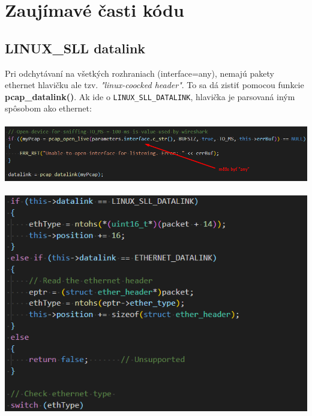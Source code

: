 \documentclass{article}
\begin{document}
    \section{Zaujímavé časti kódu}
        \subsection{LINUX\_SLL datalink}
        Pri odchytávaní na všetkých rozhraniach (interface=any), nemajú pakety ethernet hlavičku ale tzv. \emph{"linux-coocked header"}.
        To sa dá zistiť pomocou funkcie \textbf{pcap\_datalink()}. Ak ide o \texttt{LINUX\_SLL\_DATALINK}, hlavička je parsovaná iným spôsobom ako ethernet:\\\\
        \includegraphics[scale=0.6]{datalink.png}\\\\
        \includegraphics[scale=0.6]{ethernet.png}

        \newpage
\end{document}
